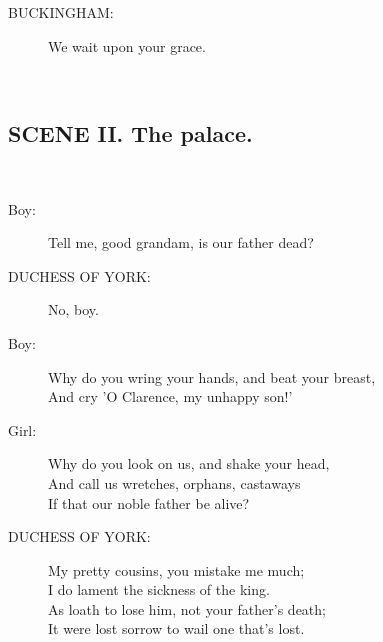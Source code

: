 \documentclass{article}
\begin{document}
\begin{description}
\item[BUCKINGHAM:] 
\hspace{1pt}We wait upon your grace.\\
\end{description}
\centering{\it [Exeunt]}\\
\subsection*{SCENE II.  The palace.}
\\
\begin{description}
\item[Boy:] 
\hspace{1pt}Tell me, good grandam, is our father dead?\\
\end{description}
\begin{description}
\item[DUCHESS OF YORK:] 
\hspace{1pt}No, boy.\\
\end{description}
\begin{description}
\item[Boy:] 
\hspace{1pt}Why do you wring your hands, and beat your breast,\\
\hspace{1pt}And cry 'O Clarence, my unhappy son!'\\
\end{description}
\begin{description}
\item[Girl:] 
\hspace{1pt}Why do you look on us, and shake your head,\\
\hspace{1pt}And call us wretches, orphans, castaways\\
\hspace{1pt}If that our noble father be alive?\\
\end{description}
\begin{description}
\item[DUCHESS OF YORK:] 
\hspace{1pt}My pretty cousins, you mistake me much;\\
\hspace{1pt}I do lament the sickness of the king.\\
\hspace{1pt}As loath to lose him, not your father's death;\\
\hspace{1pt}It were lost sorrow to wail one that's lost.\\
\end{description}
\end{document}
